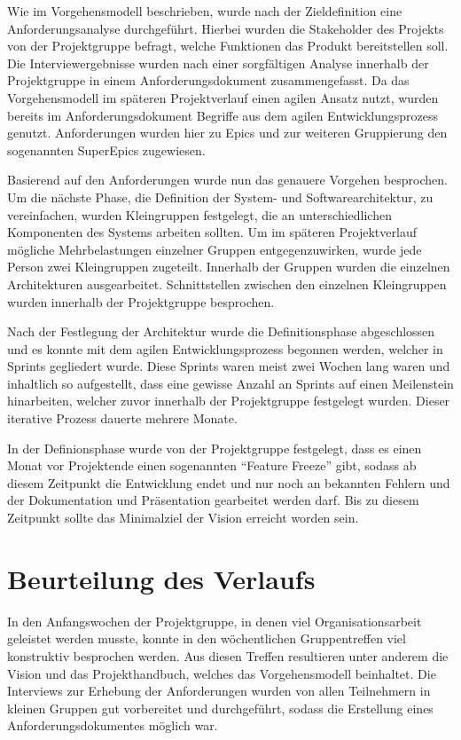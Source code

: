 Wie im Vorgehensmodell beschrieben, wurde nach der Zieldefinition eine Anforderungsanalyse durchgeführt. Hierbei wurden die Stakeholder des Projekts von der Projektgruppe befragt, welche Funktionen das Produkt bereitstellen soll.
Die Interviewergebnisse wurden nach einer sorgfältigen Analyse innerhalb der Projektgruppe in einem Anforderungsdokument zusammengefasst. 
Da das Vorgehensmodell im späteren Projektverlauf einen agilen Ansatz nutzt, wurden bereits im Anforderungsdokument Begriffe aus dem agilen Entwicklungsprozess genutzt. 
Anforderungen wurden hier zu  Epics und zur weiteren Gruppierung den sogenannten SuperEpics zugewiesen.

Basierend auf den Anforderungen wurde nun das genauere Vorgehen besprochen. Um die nächste Phase, die Definition der System- und Softwarearchitektur, zu vereinfachen, wurden Kleingruppen festgelegt, die an unterschiedlichen Komponenten des Systems arbeiten sollten. 
Um im späteren Projektverlauf mögliche Mehrbelastungen einzelner Gruppen entgegenzuwirken, wurde jede Person zwei Kleingruppen zugeteilt. 
Innerhalb der Gruppen wurden die einzelnen Architekturen ausgearbeitet. 
Schnittstellen zwischen den einzelnen Kleingruppen wurden innerhalb der Projektgruppe besprochen.

Nach der Festlegung der Architektur wurde die Definitionsphase abgeschlossen und es konnte mit dem agilen Entwicklungsprozess begonnen werden, welcher in Sprints gegliedert wurde. 
Diese Sprints waren meist zwei Wochen lang waren und inhaltlich so aufgestellt, dass eine gewisse Anzahl an Sprints auf einen Meilenstein hinarbeiten, welcher zuvor innerhalb der Projektgruppe festgelegt wurden. 
Dieser iterative Prozess dauerte mehrere Monate.

In der Definionsphase wurde von der Projektgruppe festgelegt, dass es einen Monat vor Projektende einen sogenannten "`Feature Freeze"' gibt, sodass ab diesem Zeitpunkt die Entwicklung endet und nur noch an bekannten Fehlern und der Dokumentation und Präsentation gearbeitet werden darf. 
Bis zu diesem Zeitpunkt sollte das Minimalziel der Vision erreicht worden sein.

\section{Beurteilung des Verlaufs}
In den Anfangswochen der Projektgruppe, in denen viel Organisationsarbeit geleistet werden musste, konnte in den wöchentlichen Gruppentreffen viel konstruktiv besprochen werden. Aus diesen Treffen resultieren unter anderem die Vision und das Projekthandbuch, welches das Vorgehensmodell beinhaltet.
Die Interviews zur Erhebung der Anforderungen wurden von allen Teilnehmern in kleinen Gruppen gut vorbereitet und durchgeführt, sodass die Erstellung eines Anforderungsdokumentes möglich war.

